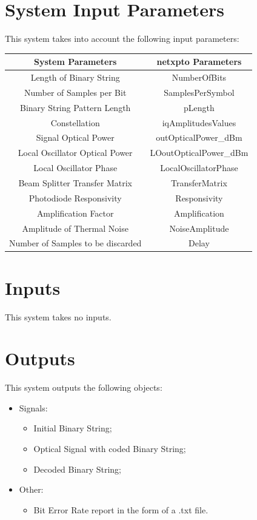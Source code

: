 \documentclass[a4paper]{article}
\begin{document}
\section{System Input Parameters}

This system takes into account the following input parameters:

\begin{table}[H]
\centering
\begin{tabular}{c|c}
System Parameters    			 & netxpto Parameters     \\ \hline
Length of Binary String 			 & NumberOfBits           \\
Number of Samples per Bit 		 & SamplesPerSymbol       \\
Binary String Pattern Length 	 & pLength                \\
Constellation 					 & iqAmplitudesValues     \\
Signal Optical Power 			 & outOpticalPower\_dBm   \\
Local Oscillator Optical Power	 & LOoutOpticalPower\_dBm \\
Local Oscillator Phase 			 & LocalOscillatorPhase   \\
Beam Splitter Transfer Matrix 	 & TransferMatrix         \\
Photodiode Responsivity 			 & Responsivity           \\
Amplification Factor 			 & Amplification          \\
Amplitude of Thermal Noise        & NoiseAmplitude         \\
Number of Samples to be discarded & Delay                  
\end{tabular}
\end{table}

\section{Inputs}

This system takes no inputs.

\section{Outputs}

This system outputs the following objects:
\begin{itemize}
\item Signals:
\begin{itemize}
\item Initial Binary String;
\item Optical Signal with coded Binary String;
\item Decoded Binary String;
\end{itemize}
\item Other:
\begin{itemize}
\item Bit Error Rate report in the form of a .txt file.
\end{itemize}
\end{itemize}
\end{document}
